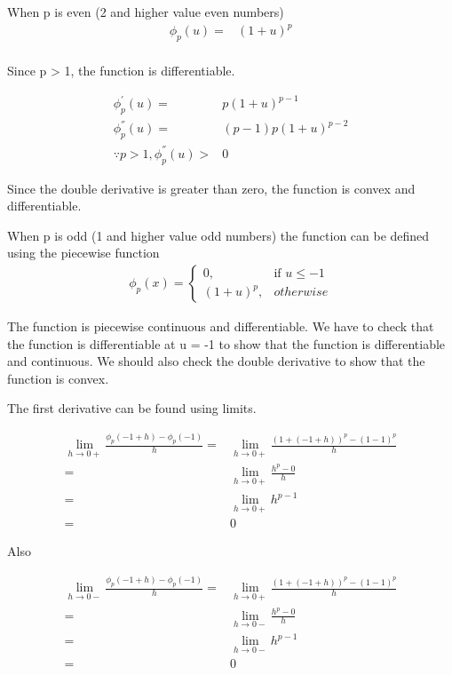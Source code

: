\documentclass{article}
\begin{document}
\begin{description}
    When p is even (2 and higher value even numbers)
    \begin{align*}
        \phi_{p}(u) = & {(1+u)}^p \\
    \end{align*}

    Since p > 1, the function is differentiable.

    \begin{align*}
        \phi^{'}_{p}(u) = & p{(1+u)}^{p - 1} \\
        \phi^{''}_{p}(u) = & {(p - 1)}p{(1+u)}^{p - 2} \\
        \because p > 1, \phi^{''}_{p}(u) > & 0
    \end{align*}

    Since the double derivative is greater than zero, the function is convex and differentiable.


    When p is odd (1 and higher value odd numbers) the function can be defined using the piecewise function
    \begin{align*}
        \phi_{p}\left(x\right) = 
        \begin{cases}
          0, & \textrm{if } u \le -1 \\
          {(1+u)}^p, & otherwise
        \end{cases}
    \end{align*}

    The function is piecewise continuous and differentiable. We have to check that the function is differentiable at u = -1 to show that the function is differentiable and continuous.  We should also check the double derivative to show that the function is convex.

    The first derivative can be found using limits.

    \begin{align*}
      \lim_{h \to 0+} \frac{\phi_{p}(-1 + h) - \phi_{p}(-1)}{h}=&  \lim_{h \to 0+} \frac{{(1 + (-1 + h))}^{p} - {(1 -1)}^{p}}{h} \\
      = & \lim_{h \to 0+} \frac{h^{p} - 0}{h} \\
      = & \lim_{h \to 0+} h^{p - 1} \\
      = & 0
    \end{align*}

    Also 
    
    \begin{align*}
      \lim_{h \to 0-} \frac{\phi_{p}(-1 + h) - \phi_{p}(-1)}{h}=&  \lim_{h \to 0+} \frac{{(1 + (-1 + h))}^{p} - {(1 -1)}^{p}}{h} \\
      = & \lim_{h \to 0-} \frac{h^{p} - 0}{h} \\
      = & \lim_{h \to 0-} h^{p - 1} \\
      = & 0
    \end{align*}


\end{description}
\end{document}
